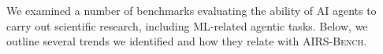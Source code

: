 \documentclass{fairmeta}
\newcommand{\bench}[1]{\textbf{#1}}
\newcommand{\airsbench}{\textsc{AIRS-Bench}}
\begin{document}

We examined a number of benchmarks evaluating the ability of AI agents to carry out scientific research, including ML-related agentic tasks. Below, we outline several trends we identified and how they relate with \airsbench.
\end{document}
